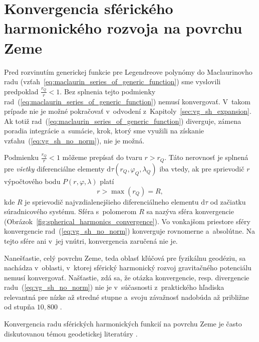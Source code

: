 \documentclass[a4paper, 12pt]{book}
\newcommand{\diff}{\mathrm d}
\begin{document}

\section{Konvergencia sférického harmonického rozvoja na povrchu Zeme}
\label{sec:convergence_of_spherical_harmonics}

Pred rozvinutím generickej funkcie pre Legendreove polynómy do Maclaurinovho 
radu (vzťah~\ref{eq:maclaurin_series_of_generic_function}) sme vyslovili 
predpoklad $\frac{r_Q}{r} < 1$.  Bez splnenia tejto podmienky 
rad~(\ref{eq:maclaurin_series_of_generic_function}) nemusí konvergovať.  
V~takom prípade nie je možné pokračovať v~odvodení 
z~Kapitoly~\ref{sec:vg_sh_expansion}.  Ak totiž 
rad~(\ref{eq:maclaurin_series_of_generic_function}) diverguje, zámena poradia 
integrácie a~sumácie, krok, ktorý sme využili na získanie 
vzťahu~(\ref{eq:vg_sh_no_norm}), nie je možná.

Podmienku $\frac{r_Q}{r} < 1$ môžeme prepísať do tvaru $r > r_Q$.  Táto 
nerovnosť je splnená pre \emph{všetky} diferenciálne elementy $\diff \tau(r_Q, 
\varphi_Q, \lambda_Q)$ iba vtedy, ak pre sprievodič $r$ výpočtového bodu $P(r, 
\varphi, \lambda)$ platí
%
\begin{equation}
r > \max(r_Q) = R{,}
\end{equation}
%
kde $R$ je sprievodič najvzdialenejšieho diferenciálneho elementu $\diff\tau$ 
od začiatku súradnicového systému.  Sféra s~polomerom $R$ sa nazýva sféra 
konvergencie \citep{Hotine} 
(Obrázok~\ref{fig:spherical_harmonics_convergence}).  Vo vonkajšom priestore 
sféry konvergencie rad~(\ref{eq:vg_sh_no_norm}) konverguje rovnomerne 
a~absolútne.  Na tejto sfére ani v~jej vnútri, konvergencia zaručená nie je.  

Nanešťastie, celý povrchu Zeme, teda oblasť kľúčová pre fyzikálnu geodéziu, sa 
nachádza v~oblasti, v~ktorej sférický harmonický rozvoj gravitačného potenciálu 
nemusí konvergovať.  Našťastie, zdá sa, že otázka konvergencie, 
resp. divergencie radu~(\ref{eq:vg_sh_no_norm}) nie je v~súčasnosti 
z~praktického hľadiska relevantná pre nízke až stredné stupne a~svoju závažnosť 
nadobúda až približne od stupňa $10{,}800$ \citep{Hirt2016,Rexer2017}.

Konvergencia radu sférických harmonických funkcií na povrchu Zeme je často 
diskutovanou témou geodetickej literatúry 
\citep{Hotine,Krarup1969,MoritzAdvancedGeodesy,Sjoberg1980,Jekeli1983,SansoGeoidDetermination}.
\end{document}
